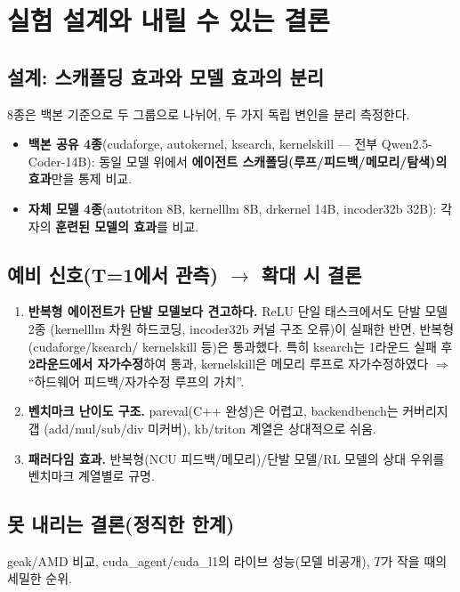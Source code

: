 \documentclass[11pt]{article}
\begin{document}
\section{실험 설계와 내릴 수 있는 결론}
\subsection{설계: 스캐폴딩 효과와 모델 효과의 분리}
8종은 백본 기준으로 두 그룹으로 나뉘어, 두 가지 독립 변인을 분리 측정한다.
\begin{itemize}
  \item \textbf{백본 공유 4종}(cudaforge, autokernel, ksearch, kernelskill --- 전부 Qwen2.5-Coder-14B):
        동일 모델 위에서 \textbf{에이전트 스캐폴딩(루프/피드백/메모리/탐색)의 효과}만을 통제 비교.
  \item \textbf{자체 모델 4종}(autotriton 8B, kernelllm 8B, drkernel 14B, incoder32b 32B):
        각자의 \textbf{훈련된 모델의 효과}를 비교.
\end{itemize}

\subsection{예비 신호(T=1에서 관측) $\rightarrow$ 확대 시 결론}
\begin{enumerate}
  \item \textbf{반복형 에이전트가 단발 모델보다 견고하다.} ReLU 단일 태스크에서도 단발 모델 2종
        (kernelllm 차원 하드코딩, incoder32b 커널 구조 오류)이 실패한 반면, 반복형(cudaforge/ksearch/
        kernelskill 등)은 통과했다. 특히 ksearch는 1라운드 실패 후 \textbf{2라운드에서 자가수정}하여 통과,
        kernelskill은 메모리 루프로 자가수정하였다 $\Rightarrow$ ``하드웨어 피드백/자가수정 루프의 가치''.
  \item \textbf{벤치마크 난이도 구조.} pareval(C++ 완성)은 어렵고, backendbench는 커버리지 갭
        (add/mul/sub/div 미커버), kb/triton 계열은 상대적으로 쉬움.
  \item \textbf{패러다임 효과.} 반복형(NCU 피드백/메모리)/단발 모델/RL 모델의 상대 우위를 벤치마크 계열별로 규명.
\end{enumerate}

\subsection{못 내리는 결론(정직한 한계)}
geak/AMD 비교, cuda\_agent/cuda\_l1의 라이브 성능(모델 비공개), $T$가 작을 때의 세밀한 순위.
\end{document}

